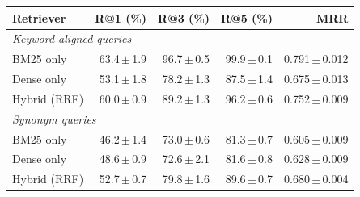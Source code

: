 \begin{tabular}{lrrrr}
\toprule
Retriever & R@1 (\%) & R@3 (\%) & R@5 (\%) & MRR\\
\midrule
\multicolumn{5}{l}{\emph{Keyword-aligned queries}}\\
BM25 only & 63.4\,$\pm$\,1.9 & 96.7\,$\pm$\,0.5 & 99.9\,$\pm$\,0.1 & 0.791\,$\pm$\,0.012\\
Dense only & 53.1\,$\pm$\,1.8 & 78.2\,$\pm$\,1.3 & 87.5\,$\pm$\,1.4 & 0.675\,$\pm$\,0.013\\
Hybrid (RRF) & 60.0\,$\pm$\,0.9 & 89.2\,$\pm$\,1.3 & 96.2\,$\pm$\,0.6 & 0.752\,$\pm$\,0.009\\
\multicolumn{5}{l}{\emph{Synonym queries}}\\
BM25 only & 46.2\,$\pm$\,1.4 & 73.0\,$\pm$\,0.6 & 81.3\,$\pm$\,0.7 & 0.605\,$\pm$\,0.009\\
Dense only & 48.6\,$\pm$\,0.9 & 72.6\,$\pm$\,2.1 & 81.6\,$\pm$\,0.8 & 0.628\,$\pm$\,0.009\\
Hybrid (RRF) & 52.7\,$\pm$\,0.7 & 79.8\,$\pm$\,1.6 & 89.6\,$\pm$\,0.7 & 0.680\,$\pm$\,0.004\\
\bottomrule
\end{tabular}
